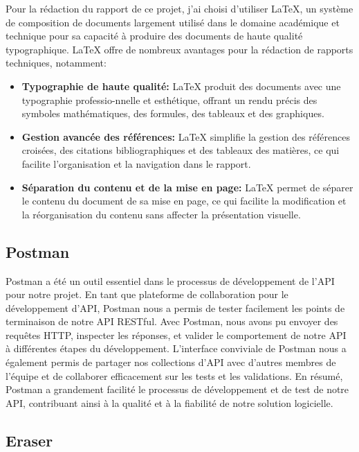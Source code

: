\hspace{16pt}Pour la rédaction du rapport de ce projet, j'ai choisi d'utiliser \LaTeX, un système de composition de documents largement utilisé dans le domaine académique et technique pour sa capacité à produire des documents de haute qualité typographique. \LaTeX\xspace offre de nombreux avantages pour la rédaction de rapports techniques, notamment:

\begin{itemize}
  \item \textbf{Typographie de haute qualité: }\LaTeX\xspace produit des documents avec une typographie professio-nnelle et esthétique, offrant un rendu précis des symboles mathématiques, des formules, des tableaux et des graphiques.
  \item \textbf{Gestion avancée des références: }\LaTeX\xspace simplifie la gestion des références croisées, des citations bibliographiques et des tableaux des matières, ce qui facilite l'organisation et la navigation dans le rapport.
  \item \textbf{Séparation du contenu et de la mise en page: }\LaTeX\xspace permet de séparer le contenu du document de sa mise en page, ce qui facilite la modification et la réorganisation du contenu sans affecter la présentation visuelle.
\end{itemize}


\subsection{Postman}

\hspace{16pt}Postman a été un outil essentiel dans le processus de développement de l'API pour notre projet. En tant que plateforme de collaboration pour le développement d'API, Postman nous a permis de tester facilement les points de terminaison de notre API RESTful. Avec Postman, nous avons pu envoyer des requêtes HTTP, inspecter les réponses, et valider le comportement de notre API à différentes étapes du développement. L'interface conviviale de Postman nous a également permis de partager nos collections d'API avec d'autres membres de l'équipe et de collaborer efficacement sur les tests et les validations. En résumé, Postman a grandement facilité le processus de développement et de test de notre API, contribuant ainsi à la qualité et à la fiabilité de notre solution logicielle.


\subsection{Eraser}

